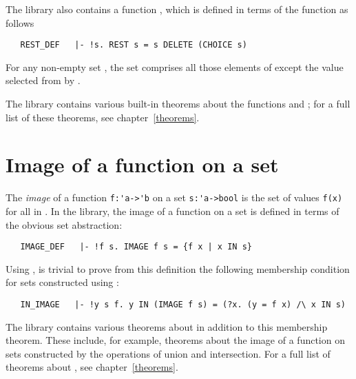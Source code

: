 The library also contains a function , which is defined in terms of
the  function as follows

\begin{hol}
\begin{verbatim}
   REST_DEF   |- !s. REST s = s DELETE (CHOICE s)
\end{verbatim}\end{hol}

\noindent For any non-empty set , the set  comprises all those
elements of  except the value selected from  by .

The library contains various built-in theorems about the functions 
and ; for a full list of these theorems, see chapter~\ref{theorems}.

\section{Image of a function on a set}

The {\it image\/} of a function {\small\verb!f:'a->'b!} on a set
{\small\verb!s:'a->bool!} is the set of values {\small\verb!f(x)!} for all
 in .  In the  library, the image of a function on a
set is defined in terms of the obvious set abstraction:

\begin{hol}
\begin{verbatim}
   IMAGE_DEF   |- !f s. IMAGE f s = {f x | x IN s}
\end{verbatim}\end{hol}

\noindent Using , is trivial to prove from this
definition the following membership condition for sets constructed using
:

\begin{hol}
\begin{verbatim}
   IN_IMAGE   |- !y s f. y IN (IMAGE f s) = (?x. (y = f x) /\ x IN s)
\end{verbatim}\end{hol}

\noindent The  library contains various theorems about
 in addition to this membership theorem.  These include, for example,
theorems about the image of a function on sets constructed by the operations of
union and intersection.  For a full list of theorems about , see
chapter~\ref{theorems}.

